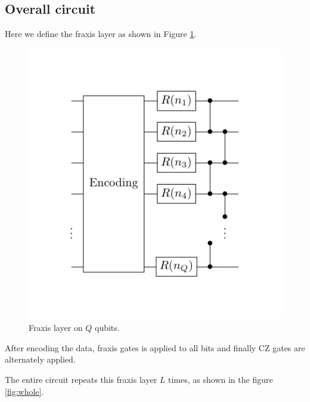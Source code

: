 \subsection{Overall circuit}
Here we define the fraxis layer as shown in Figure \ref{fig:ansatz}.
\begin{figure}[H]
    \centering
    \includegraphics[keepaspectratio, scale=1]{experiment/figure/layer.pdf}
    \caption{Fraxis layer on $Q$ qubits.}
    \label{fig:ansatz}
\end{figure}
After encoding the data, fraxis gates is applied to all bits and finally CZ gates are alternately applied.
\par The entire circuit repeats this fraxis layer $L$ times, as shown in the figure \ref{fig:whole}.
